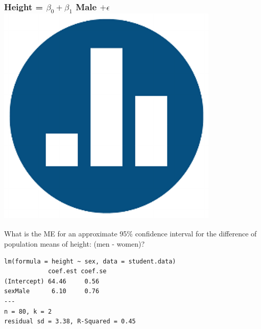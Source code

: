 \begin{frame}[fragile]
\frametitle{Height = $\beta_0 + \beta_1$ Male $+ \epsilon$ \hfill \includegraphics[scale = 0.05]{./images/clicker}}

\alert{What is the ME for an approximate 95\% confidence interval for the difference of population means of height: (men - women)?}

\footnotesize
\begin{verbatim}
lm(formula = height ~ sex, data = student.data)
            coef.est coef.se
(Intercept) 64.46     0.56  
sexMale      6.10     0.76  
---
n = 80, k = 2
residual sd = 3.38, R-Squared = 0.45
\end{verbatim}

\end{frame}





